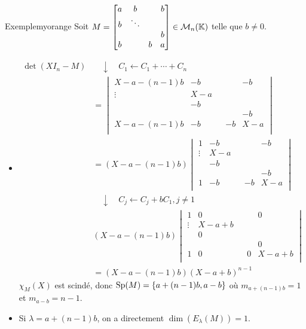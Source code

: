     \begin{omed}{Exemple}{myorange}
        Soit $M = \begin{bmatrix}
            a & b & & b \\
            b & \ddots & &  \\
            & & & b \\
            b & & b & a
        \end{bmatrix} \in \mathcal{M}_{n}(\mathbb{K})$ telle que $b \neq 0$.
        \begin{itemize}
            \item \begin{align*}
                \det(X I_n - M) 
                &\quad \downarrow \quad C_1 \leftarrow C_1 + \cdots + C_n \\
                &= \begin{vmatrix}
                    X - a - (n-1)b & -b & & & -b \\
                    \vdots & X - a & & & \\
                    & -b & & &  \\
                    &  & & & - b \\
                    X- a - (n-1)b & -b & & -b & X - a \\
                \end{vmatrix} \\
                &= (X - a - (n-1)b) \begin{vmatrix}
                    1 & -b & & & -b \\
                    \vdots & X - a & & & \\
                    & -b & & &  \\
                    &  & & & - b \\
                    1 & -b & & -b & X - a \\
                \end{vmatrix} \\
                & \quad \downarrow \quad C_j \leftarrow C_j + b C_1, j \neq 1 \\
                & (X -a - (n-1)b) \begin{vmatrix}
                    1 & 0 & & & 0 \\
                    \vdots & X - a + b & & & \\
                    & 0 & & &  \\
                    &  & & & 0 \\
                    1 & 0 & & 0 & X - a  + b\\
                \end{vmatrix} \\ 
                &= (X - a - (n-1)b) (X - a + b)^{n-1}
            \end{align*}
            $\chi_M(X)$ est scindé, donc $\operatorname{Sp}(M) = \left\{a + (n-1)b, a - b\right\}$ où $m_{a + (n-1)b} = 1$ et $m_{a-b} = n-1$. 
            \item Si $\lambda = a + (n-1)b$, on a directement $\dim(E_{\lambda}(M)) = 1$.
            

\end{itemize}
\end{omed}
